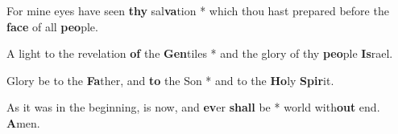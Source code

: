 \begin{multicols}{2}
%	

	For mine eyes have seen \textbf{thy} sal\textbf{va}tion * which thou hast prepared before the \textbf{face} of all \textbf{peo}ple.
	
	A light to the revelation \textbf{of} the \textbf{Gen}tiles * and the glory of thy \textbf{peo}ple \textbf{Is}rael.
	
	Glory be to the \textbf{Fa}ther, and \textbf{to} the Son * and to the \textbf{Ho}ly \textbf{Spir}it.
	
	As it was in the beginning, is now, and \textbf{ev}er \textbf{shall} be * world with\textbf{out} end. \textbf{A}men.
\end{multicols}